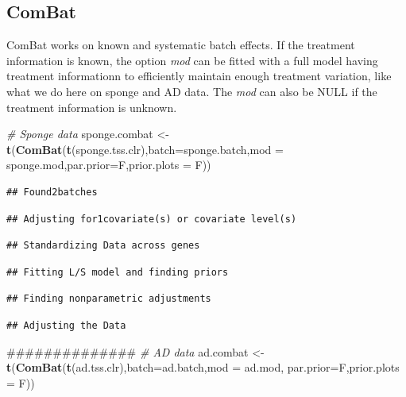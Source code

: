 \documentclass[]{book}
\newenvironment{Shaded}{\begin{snugshade}}{\end{snugshade}}
\newcommand{\KeywordTok}[1]{\textcolor[rgb]{0.13,0.29,0.53}{\textbf{#1}}}
\newcommand{\DataTypeTok}[1]{\textcolor[rgb]{0.13,0.29,0.53}{#1}}
\newcommand{\StringTok}[1]{\textcolor[rgb]{0.31,0.60,0.02}{#1}}
\newcommand{\CommentTok}[1]{\textcolor[rgb]{0.56,0.35,0.01}{\textit{#1}}}
\newcommand{\NormalTok}[1]{#1}
\begin{document}
\subsection{ComBat}\label{combat}

ComBat works on known and systematic batch effects. If the treatment
information is known, the option \emph{mod} can be fitted with a full
model having treatment informationn to efficiently maintain enough
treatment variation, like what we do here on sponge and AD data. The
\emph{mod} can also be NULL if the treatment information is unknown.

\begin{Shaded}
\begin{Highlighting}[]
\CommentTok{# Sponge data}
\NormalTok{sponge.combat <-}\StringTok{ }\KeywordTok{t}\NormalTok{(}\KeywordTok{ComBat}\NormalTok{(}\KeywordTok{t}\NormalTok{(sponge.tss.clr),}\DataTypeTok{batch=}\NormalTok{sponge.batch,}\DataTypeTok{mod =}\NormalTok{ sponge.mod,}\DataTypeTok{par.prior=}\NormalTok{F,}\DataTypeTok{prior.plots =}\NormalTok{ F))}
\end{Highlighting}
\end{Shaded}

\begin{verbatim}
## Found2batches
\end{verbatim}

\begin{verbatim}
## Adjusting for1covariate(s) or covariate level(s)
\end{verbatim}

\begin{verbatim}
## Standardizing Data across genes
\end{verbatim}

\begin{verbatim}
## Fitting L/S model and finding priors
\end{verbatim}

\begin{verbatim}
## Finding nonparametric adjustments
\end{verbatim}

\begin{verbatim}
## Adjusting the Data
\end{verbatim}

\begin{Shaded}
\begin{Highlighting}[]
\NormalTok{##############}
\CommentTok{# AD data}
\NormalTok{ad.combat <-}\StringTok{ }\KeywordTok{t}\NormalTok{(}\KeywordTok{ComBat}\NormalTok{(}\KeywordTok{t}\NormalTok{(ad.tss.clr),}\DataTypeTok{batch=}\NormalTok{ad.batch,}\DataTypeTok{mod =}\NormalTok{ ad.mod, }\DataTypeTok{par.prior=}\NormalTok{F,}\DataTypeTok{prior.plots =}\NormalTok{ F))}
\end{Highlighting}
\end{Shaded}
\end{document}
